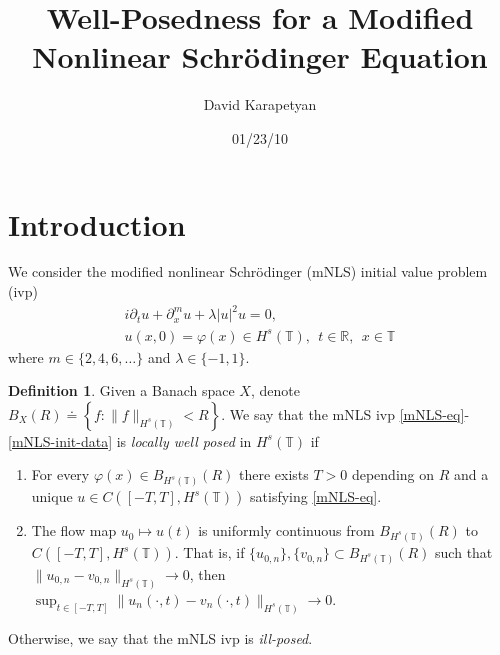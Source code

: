 \documentclass[12pt,reqno]{amsart}
\numberwithin{equation}{section}  %
\numberwithin{figure}{section}
\newcommand{\rr}{\mathbb{R}}
\newcommand{\ci}{\mathbb{T}}
\newcommand{\p}{\partial}
\newcommand{\vp}{\varphi}
\theoremstyle{plain}
\theoremstyle{definition}
\newtheorem{definition}{Definition}
\theoremstyle{remark}
\begin{document}
\title{Well-Posedness for a Modified Nonlinear Schr\"{o}dinger Equation }
\author{David Karapetyan}
\address{Department of Mathematics  \\
         University  of Notre Dame\\
		          Notre Dame, IN 46556 }
				  \date{01/23/10}
				  \maketitle
				  \section{Introduction}
				  We consider the modified nonlinear Schr\"{o}dinger (mNLS) 
				  initial value problem (ivp)
%
%
\begin{gather}
	\label{mNLS-eq}
	i \p_t u + \p_x^{m} u + \lambda |u|^2 u =0,
		\\
		\label{mNLS-init-data}
		u(x,0) = \vp(x) \in H^s(\ci), \ \ t \in \rr, \ \ x \in \ci
\end{gather}
%
%
where $m \in \{2,4,6,\dots\}$ and $\lambda \in \{-1, 1\}$. 
%
%
\begin{definition}
  Given a Banach space $X$, denote $B_{X}(R) \doteq \left\{ f: \| f \|_{H^{s}(\ci)} < R
      \right\}$. We say that the mNLS ivp \eqref{mNLS-eq}-\eqref{mNLS-init-data} is
	\emph{locally well posed} in
	$H^s(\ci)$ if 
	\begin{enumerate}
    \item For every $\vp(x) \in B_{H^{s}(\ci)}(R)$
      there exists $T>0$ depending on $R$ and a unique $u \in C([-T,
      T], H^s(\ci))$ satisfying \eqref{mNLS-eq}.
    \item
      The flow map $u_0 \mapsto u(t)$ is uniformly continuous from
      $B_{H^{s}(\ci)}(R)$ 
      to $C(\left[ -T, T \right], H^s(\ci))$. That is, if
      $\{u_{0,n} \}, \{v_{0,n}\} \subset B_{H^{s}(\ci)}(R)$ such that $\|u_{0,n} -
      v_{0,n} \|_{H^{s}(\ci)} \to 0$, then \\
      $\sup_{t \in [-T, T]}
      \|u_{n}(\cdot, t) - v_{n}(\cdot, t) \|_{H^s(\ci)} \to 0$.
  \end{enumerate}
	Otherwise, we say that the mNLS ivp is \emph{ill-posed}.
\end{definition}
%
\end{document}
